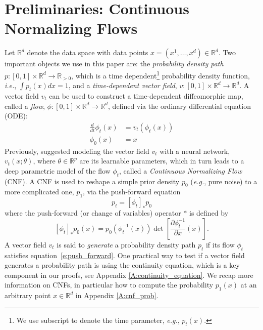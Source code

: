 \documentclass{article}
\makeatletter
\newcommand{\brac}[1]{\left [#1\right ]}
\newcommand{\Real}{\mathbb R}
\newcommand{\too}{\rightarrow}
\newcommand{\eg}{{e.g.}}
\newcommand{\ie}{{i.e.}}
\def\eqref#1{equation~\ref{#1}}
\renewcommand*{\eg}{{\it e.g.}\@\xspace}
\renewcommand*{\ie}{{\it i.e.}\@\xspace}
\makeatother
\begin{document}
\section{Preliminaries: Continuous Normalizing Flows}
\label{s:prelim}
Let $\Real^d$ denote the data space with data points $x=(x^1,\ldots,x^d) \in \Real^d$. Two important objects we use in this paper are: the \emph{probability density path} $p:[0,1]\times \Real^d \too \Real_{>0}$, which is a time dependent\footnote{We use subscript to denote the time parameter, 
\eg, $p_t(x)$.} probability density function, \ie, $\int p_t(x)dx = 1$, and a \emph{time-dependent vector field}, $v:[0,1]\times \Real^d \too \Real^d$. A vector field $v_t$ can be used to construct a time-dependent diffeomorphic map, called a \emph{flow}, $\phi:[0,1]\times \Real^d \too \Real^d$, defined via the ordinary differential equation (ODE):
\begin{align}\label{e:ode}
    \frac{d}{dt}\phi_t(x) &= v_t(\phi_t(x)) \\
    \phi_0(x) &= x
\end{align}
Previously, \cite{chen2018neural} suggested modeling the vector field $v_t$ with a neural network, $v_t(x;\theta)$, where $\theta\in \Real^p$ are its learnable parameters, which in turn leads to a deep parametric model of the flow $\phi_t$, called a \emph{Continuous Normalizing Flow} (CNF). A CNF is used to reshape a simple prior density $p_0$ (\eg, pure noise) to a more complicated one, $p_1$, via the push-forward equation
\begin{equation}\label{e:push_forward}
p_t = [\phi_t]_* p_0
\end{equation}
where the push-forward (or change of variables) operator $*$ is defined by
\begin{equation}\label{e:push_forward_explicit}
    [\phi_t]_* p_0(x) = p_0(\phi_t^{-1}(x))\det \brac{ \frac{\partial \phi_t^{-1}}{\partial x}(x)}.
\end{equation}
A vector field $v_t$ is said to \emph{generate} a probability density path $p_t$ if its flow $\phi_t$ satisfies \eqref{e:push_forward}. One practical way to test if a vector field generates a probability path is using the continuity equation, which is a key component in our proofs, see Appendix \ref{A:continuity_equation}. We recap more information on CNFs, in particular how to compute the probability $p_1(x)$ at an arbitrary point $x\in\Real^d$ in Appendix \ref{A:cnf_prob}. 
\end{document}
